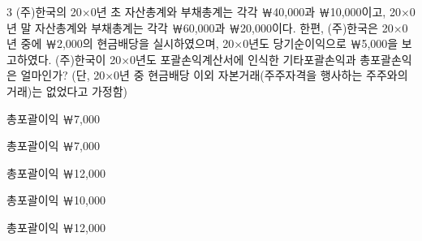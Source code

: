 \begin{question}{3}
(주)한국의 20×0년 초 자산총계와 부채총계는 각각 ￦40,000과 ￦10,000이고, 20×0년 말 자산총계와 부채총계는 각각 ￦60,000과 ￦20,000이다. 한편, (주)한국은 20×0년 중에 ￦2,000의 현금배당을 실시하였으며, 20×0년도 당기순이익으로 ￦5,000을 보고하였다. (주)한국이 20×0년도 포괄손익계산서에 인식한 기타포괄손익과 총포괄손익은 얼마인가? (단, 20×0년 중 현금배당 이외 자본거래(주주자격을 행사하는 주주와의 거래)는 없었다고 가정함)
\begin{choices}
  \item {}총포괄이익 ￦7,000
  \item {}총포괄이익 ￦7,000
  \item {}총포괄이익 ￦12,000
  \item {}총포괄이익 ￦10,000
  \item {}총포괄이익 ￦12,000
\end{choices}
\end{question}
